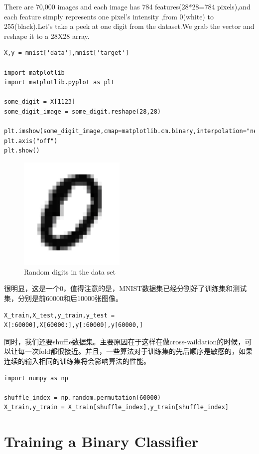 \documentclass[UTF8]{ctexart}
\begin{document}
There are 70,000 images and each image has 784 features(28*28=784 pixels),and each feature simply represents one pixel's intensity ,from 0(white) to 255(black).Let's take a peek at one digit from the dataset.We grab the vector and reshape it to a 28X28 array.

\begin{lstlisting}
X,y = mnist['data'],mnist['target']

import matplotlib
import matplotlib.pyplot as plt

some_digit = X[1123]
some_digit_image = some_digit.reshape(28,28)

plt.imshow(some_digit_image,cmap=matplotlib.cm.binary,interpolation="nearest")
plt.axis("off")
plt.show()
\end{lstlisting}

\begin{figure}[H]
\centering
\includegraphics[width = 2in]{some_digit.JPG}
\caption{Random digits in the data set}
\end{figure}
很明显，这是一个0，值得注意的是，MNIST数据集已经分割好了训练集和测试集，分别是前60000和后10000张图像。

\begin{lstlisting}
X_train,X_test,y_train,y_test = X[:60000],X[60000:],y[:60000],y[60000,]
\end{lstlisting}

同时，我们还要shuffle数据集。主要原因在于这样在做cross-vaildation的时候，可以让每一次fold都很接近。并且，一些算法对于训练集的先后顺序是敏感的，如果连续的输入相同的训练集将会影响算法的性能。

\begin{lstlisting}
import numpy as np

shuffle_index = np.random.permutation(60000)
X_train,y_train = X_train[shuffle_index],y_train[shuffle_index]
\end{lstlisting}

\section{Training a Binary Classifier}
\end{document}
